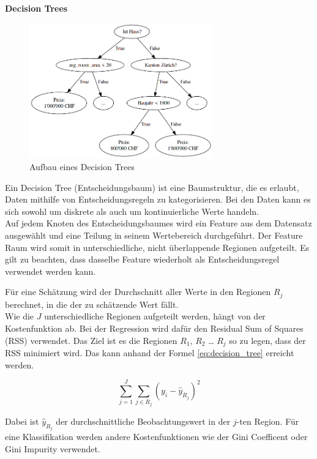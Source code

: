 \textbf{Decision Trees}

\begin{figure}[h]\label{fig:decision_tree}
  \centering
  \includegraphics[width=0.7\textwidth]{images/decision_tree.png}
  \caption[Aufbau eines Decision Trees]{Aufbau eines Decision Trees}
\end{figure}

Ein Decision Tree (Entscheidungsbaum) ist eine Baumstruktur, die es erlaubt, Daten mithilfe von Entscheidungsregeln zu kategorisieren. Bei den Daten kann es sich sowohl um diskrete als auch um kontinuierliche Werte handeln.\\
Auf jedem Knoten des Entscheidungsbaumes wird ein Feature aus dem Datensatz ausgewählt und eine Teilung in seinem Wertebereich durchgeführt. Der Feature Raum wird somit in unterschiedliche, nicht überlappende Regionen aufgeteilt. Es gilt zu beachten, dass dasselbe Feature wiederholt als Entscheidungsregel verwendet werden kann.

Für eine Schätzung wird der Durchschnitt aller Werte in den Regionen $R_j$ berechnet, in die der zu schätzende Wert fällt.\\
Wie die  $J$ unterschiedliche Regionen aufgeteilt werden, hängt von der Kostenfunktion ab. Bei der Regression wird dafür den Residual Sum of Squares (RSS) verwendet. Das Ziel ist es die Regionen $R_1$, $R_2$ … $R_j$ so zu legen, dass der RSS minimiert wird. Das kann anhand der Formel \eqref{eq:decision_tree} erreicht werden.

\begin{equation}
\label{eq:decision_tree}
\sum_{j=1}^{J} \sum_{j \in R_j}^{} (y_i - \hat{y}_{R_j})^2
\end{equation}

Dabei ist $\hat{y}_{R_j}$ der durchschnittliche Beobachtungswert in der $j$-ten Region. Für eine Klassifikation werden andere Kostenfunktionen wie der Gini Coefficent oder Gini Impurity verwendet.

